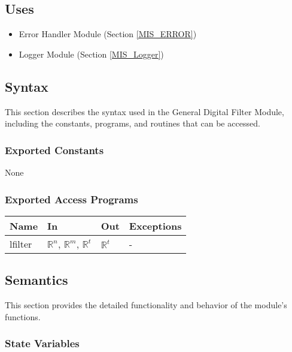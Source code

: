 \documentclass[12pt, titlepage]{article}
\begin{document}
\subsection{Uses}

\begin{itemize}
\item Error Handler Module (Section \ref{MIS_ERROR})
\item Logger Module (Section \ref{MIS_Logger})
\end{itemize}

\subsection{Syntax}

This section describes the syntax used in the General Digital Filter Module,
including the constants, programs, and routines that can be accessed.

\subsubsection{Exported Constants}

None

\subsubsection{Exported Access Programs}

\begin{center}
\begin{tabular}{p{3cm} p{4cm} p{4cm} p{2cm}}
\hline
\textbf{Name} & \textbf{In} & \textbf{Out} & \textbf{Exceptions} \\
\hline
lfilter & $\mathbb{R}^n$, $\mathbb{R}^m$, $\mathbb{R}^t$ & $\mathbb{R}^t$ & - \\
\hline
\end{tabular}
\end{center}

\subsection{Semantics}

This section provides the detailed functionality and behavior of the module’s
functions.

\subsubsection{State Variables}
\end{document}
